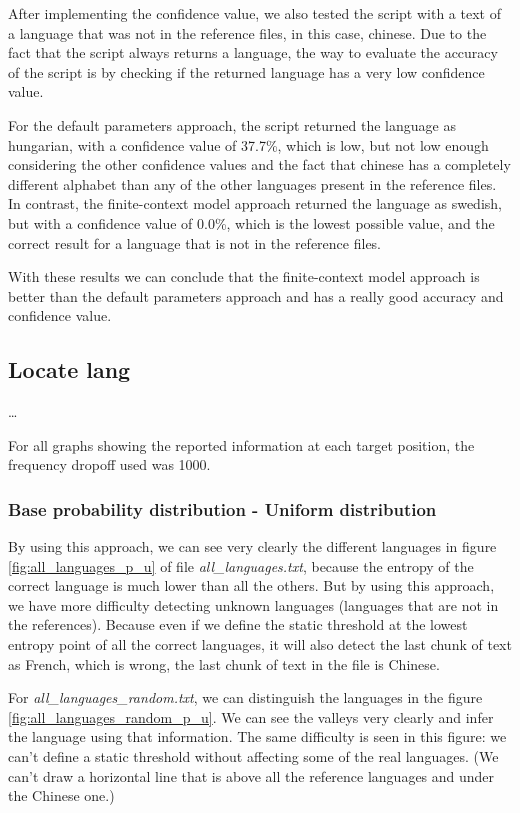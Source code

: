 \documentclass{article}
\begin{document}
After implementing the confidence value, we also tested the script with a text of a language that was not in the reference files, in this case, chinese.
Due to the fact that the script always returns a language, the way to evaluate the accuracy of the script is by checking if the returned language has a very low confidence value.

For the default parameters approach, the script returned the language as hungarian, with a confidence value of 37.7\%, which is low, but not low enough considering the other confidence values and
the fact that chinese has a completely different alphabet than any of the other languages present in the reference files.
In contrast, the finite-context model approach returned the language as swedish, but with a confidence value of 0.0\%, which is the lowest possible value, and the correct result
for a language that is not in the reference files.

With these results we can conclude that the finite-context model approach is better than the default parameters approach and has a really good accuracy and confidence value.

\subsection{Locate lang}
\label{subsec:results_locate_lang}

\dots

For all graphs showing the reported information at each target position, the frequency dropoff used was 1000.

\subsubsection{Base probability distribution - Uniform distribution}
\label{subsubsec:results_locate_lang_uniform_distribution}

By using this approach, we can see very clearly the different languages in figure \ref{fig:all_languages_p_u} of file \textit{all_languages.txt},
because the entropy of the correct language is much lower than all the others.
But by using this approach, we have more difficulty detecting unknown languages (languages that are not in the references).
Because even if we define the static threshold at the lowest entropy point of all the correct languages,
it will also detect the last chunk of text as French, which is wrong, the last chunk of text in the file is Chinese.

For \textit{all_languages_random.txt}, we can distinguish the languages in the figure \ref{fig:all_languages_random_p_u}.
We can see the valleys very clearly and infer the language using that information.
The same difficulty is seen in this figure: we can't define a static threshold without affecting some of the real languages.
(We can't draw a horizontal line that is above all the reference languages and under the Chinese one.)
\end{document}
